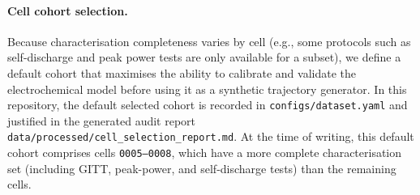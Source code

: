 \paragraph{Cell cohort selection.}
Because characterisation completeness varies by cell (e.g., some protocols such
as self-discharge and peak power tests are only available for a subset), we
define a default cohort that maximises the ability to calibrate and validate
the electrochemical model before using it as a synthetic trajectory generator.
In this repository, the default selected cohort is recorded in
\texttt{configs/dataset.yaml} and justified in the generated audit report
\texttt{data/processed/cell\_selection\_report.md}. At the time of writing, this
default cohort comprises cells \texttt{0005--0008}, which have a more complete
characterisation set (including GITT, peak-power, and self-discharge tests) than
the remaining cells.
